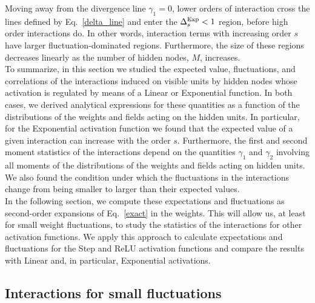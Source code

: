 \documentclass[11pt,letterpaper]{article}
\begin{document}
Moving away from the divergence line $\gamma_1=0$, lower orders of interaction cross the lines defined by Eq.~\eqref{delta_line} and enter the $\Delta^{\rm Exp}_s<1$ region, before high order interactions do. In other words, 
interaction terms with increasing order $s$ have larger fluctuation-dominated regions. Furthermore, the size of these regions decreases linearly as the number of hidden nodes, $M$, increases.\\
To summarize, in this section we studied the expected value, fluctuations, and correlations of the interactions induced on visible units by hidden nodes whose activation is regulated by means of a Linear or Exponential function. In both cases, we derived analytical expressions for these quantities as a function of the distributions of the weights and fields acting on the hidden units. In particular, for the Exponential activation function we found that the expected value of a given interaction can increase with the order $s$. Furthermore, the first and second moment statistics of the interactions depend on the quantities $\gamma_1$ and $\gamma_2$ involving all moments of the distributions of the weights and fields acting on hidden units. We also found the condition under which the fluctuations in the interactions change from being smaller to larger than their expected values.\\
In the following section, we compute these expectations and fluctuations as second-order expansions of Eq.~\eqref{exact} in the weights. This will allow us, at least for small weight fluctuations, to study the statistics of the interactions for other activation functions. We apply this approach to calculate expectations and fluctuations for the Step and ReLU activation functions and compare the results with Linear and, in particular, Exponential activations. 

\subsection{Interactions for small fluctuations}
\end{document}
